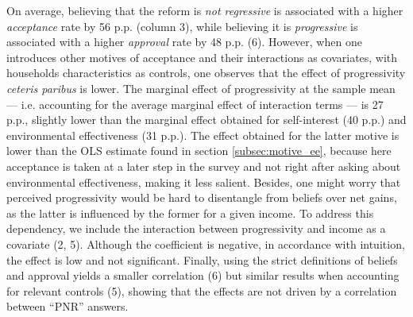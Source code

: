 \documentclass[11pt]{article}
\begin{document}
On average, believing that the reform is \textit{not regressive} is associated with a higher \textit{acceptance} rate by 56 p.p. (column 3), while believing it is \textit{progressive} is associated with a higher \textit{approval} rate by 48 p.p. (6). However, when one introduces other motives of acceptance and their interactions as covariates, with households characteristics as controls, one observes that the effect of progressivity \textit{ceteris paribus} is lower. The marginal effect of progressivity at the sample mean --- i.e. accounting for the average marginal effect of interaction terms --- is 27 p.p., slightly lower than the marginal effect obtained for self-interest (40 p.p.) and environmental effectiveness (31 p.p.). The effect obtained for the latter motive is lower than the OLS estimate found in section \ref{subsec:motive_ee}, because here acceptance is taken at a later step in the survey and not right after asking about environmental effectiveness, making it less salient. Besides, one might worry that perceived progressivity would be hard to disentangle from beliefs over net gains, as the latter is influenced by the former for a given income. To address this dependency, we include the interaction between progressivity and income as a covariate (2, 5). Although the coefficient is negative, in accordance with intuition, the effect is low and not significant. Finally, using the strict definitions of beliefs and approval yields a smaller correlation (6) but similar results when accounting for relevant controls (5), showing that the effects are not driven by a correlation between ``PNR'' answers.

\end{document}
